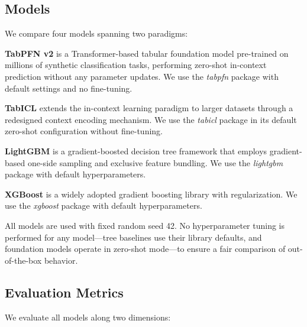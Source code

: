 \documentclass{SYSUReport}
\begin{document}
\subsection{Models}
We compare four models spanning two paradigms:

\textbf{TabPFN v2} is a Transformer-based tabular foundation model pre-trained on millions of synthetic classification tasks, performing zero-shot in-context prediction without any parameter updates. We use the \textit{tabpfn} package with default settings and no fine-tuning.

\textbf{TabICL} extends the in-context learning paradigm to larger datasets through a redesigned context encoding mechanism. We use the \textit{tabicl} package in its default zero-shot configuration without fine-tuning.

\textbf{LightGBM} is a gradient-boosted decision tree framework that employs gradient-based one-side sampling and exclusive feature bundling. We use the \textit{lightgbm} package with default hyperparameters.

\textbf{XGBoost} is a widely adopted gradient boosting library with regularization. We use the \textit{xgboost} package with default hyperparameters.

All models are used with fixed random seed 42. No hyperparameter tuning is performed for any model—tree baselines use their library defaults, and foundation models operate in zero-shot mode—to ensure a fair comparison of out-of-the-box behavior.


\subsection{Evaluation Metrics}
We evaluate all models along two dimensions:
\end{document}
